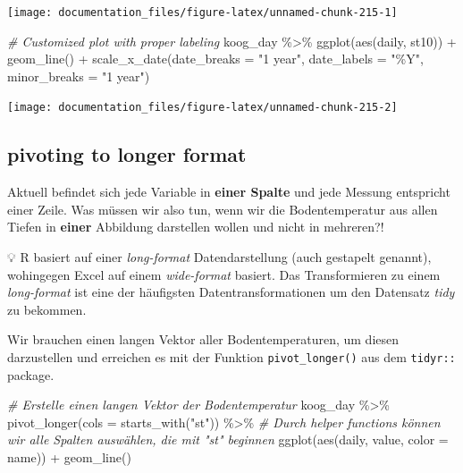 \documentclass[
]{article}
\newenvironment{Shaded}{\begin{snugshade}}{\end{snugshade}}
\newcommand{\AttributeTok}[1]{\textcolor[rgb]{0.77,0.63,0.00}{#1}}
\newcommand{\CommentTok}[1]{\textcolor[rgb]{0.56,0.35,0.01}{\textit{#1}}}
\newcommand{\FunctionTok}[1]{\textcolor[rgb]{0.00,0.00,0.00}{#1}}
\newcommand{\NormalTok}[1]{#1}
\newcommand{\SpecialCharTok}[1]{\textcolor[rgb]{0.00,0.00,0.00}{#1}}
\newcommand{\StringTok}[1]{\textcolor[rgb]{0.31,0.60,0.02}{#1}}
\begin{document}
\begin{center}\texttt{[image: documentation\_files/figure-latex/unnamed-chunk-215-1]} \end{center}

\begin{Shaded}
\begin{Highlighting}[]
\CommentTok{\# Customized plot with proper labeling}
\NormalTok{koog\_day }\SpecialCharTok{\%\textgreater{}\%}
  \FunctionTok{ggplot}\NormalTok{(}\FunctionTok{aes}\NormalTok{(daily, st10)) }\SpecialCharTok{+}
  \FunctionTok{geom\_line}\NormalTok{() }\SpecialCharTok{+}
  \FunctionTok{scale\_x\_date}\NormalTok{(}\AttributeTok{date\_breaks =} \StringTok{"1 year"}\NormalTok{, }\AttributeTok{date\_labels =} \StringTok{"\%Y"}\NormalTok{, }\AttributeTok{minor\_breaks =} \StringTok{"1 year"}\NormalTok{)}
\end{Highlighting}
\end{Shaded}

\begin{center}\texttt{[image: documentation\_files/figure-latex/unnamed-chunk-215-2]} \end{center}

\hypertarget{pivoting-to-longer-format}{%
\subsection{pivoting to longer format}\label{pivoting-to-longer-format}}

Aktuell befindet sich jede Variable in \textbf{einer Spalte} und jede Messung entspricht einer Zeile. Was müssen wir also tun, wenn wir die Bodentemperatur aus allen Tiefen in \textbf{einer} Abbildung darstellen wollen und nicht in mehreren?!

💡 R basiert auf einer \emph{long-format} Datendarstellung (auch gestapelt genannt), wohingegen Excel auf einem \emph{wide-format} basiert. Das Transformieren zu einem \emph{long-format} ist eine der häufigsten Datentransformationen um den Datensatz \emph{tidy} zu bekommen.

Wir brauchen einen langen Vektor aller Bodentemperaturen, um diesen darzustellen und erreichen es mit der Funktion \texttt{pivot\_longer()} aus dem \texttt{tidyr::} package.

\begin{Shaded}
\begin{Highlighting}[]
\CommentTok{\# Erstelle einen langen Vektor der Bodentemperatur}
\NormalTok{koog\_day }\SpecialCharTok{\%\textgreater{}\%}
  \FunctionTok{pivot\_longer}\NormalTok{(}\AttributeTok{cols =} \FunctionTok{starts\_with}\NormalTok{(}\StringTok{"st"}\NormalTok{)) }\SpecialCharTok{\%\textgreater{}\%} \CommentTok{\# Durch helper functions können wir alle Spalten auswählen, die mit "st" beginnen}
  \FunctionTok{ggplot}\NormalTok{(}\FunctionTok{aes}\NormalTok{(daily, value, }\AttributeTok{color =}\NormalTok{ name)) }\SpecialCharTok{+}
  \FunctionTok{geom\_line}\NormalTok{()}
\end{Highlighting}
\end{Shaded}
\end{document}
